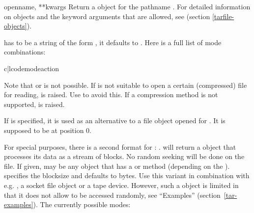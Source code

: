 \begin{funcdesc}{open}{name, **kwargs}
    Return a  object for the pathname .
    For detailed information on  objects and the keyword
    arguments that are allowed, see 
    (section \ref{tarfile-objects}).

     has to be a string of the form ,
    it defaults to . Here is a full list of mode combinations:

    \begin{tableii}{c|l}{code}{mode}{action}
    \end{tableii}

    Note that  or  is not possible.
    If  is not suitable to open a certain (compressed) file for
    reading,  is raised. Use   to
    avoid this.  If a compression method is not supported,
     is raised.

    If  is specified, it is used as an alternative to a file
    object opened for . It is supposed to be at position 0.

    For special purposes, there is a second format for :
    .   will return a
     object that processes its data as a stream of
    blocks.  No random seeking will be done on the file. If given,
     may be any object that has a  or
     method (depending on the ).
     specifies the blocksize and defaults to  bytes. Use this variant in combination with
    e.g. , a socket file object or a tape device.
    However, such a  object is limited in that it does
    not allow to be accessed randomly, see ``Examples''
    (section~\ref{tar-examples}).  The currently possible modes:


\end{funcdesc}
